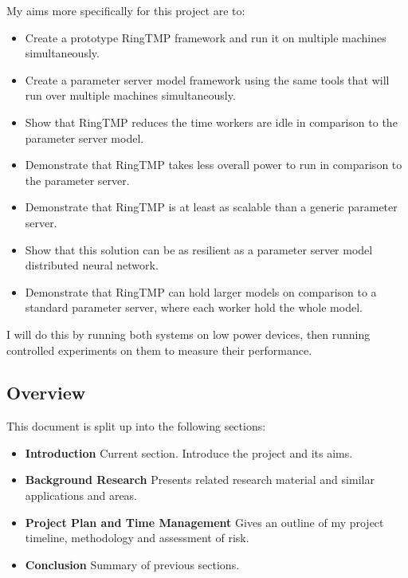 My aims more specifically for this project are to:
\begin{itemize}
    \item Create a prototype RingTMP framework and run it on multiple machines
    simultaneously.
    \item Create a parameter server model framework using the same tools that
    will run over multiple machines simultaneously.
    \item Show that RingTMP reduces the time workers are idle in comparison to
    the parameter server model.
    \item Demonstrate that RingTMP takes less overall power to run in comparison
    to the parameter server.
    \item Demonstrate that RingTMP is at least as scalable than a generic parameter
    server.
    \item Show that this solution can be as resilient as a parameter server
    model distributed neural network.
    \item Demonstrate that RingTMP can hold larger models on comparison to a
    standard parameter server, where each worker hold the whole model.
\end{itemize}
I will do this by running both systems on low power devices, then running
controlled experiments on them to measure their performance.



\subsection{Overview}
This document is split up into the following sections:
\begin{itemize}
 \item \textbf{Introduction} Current section. Introduce the project and its aims.
 \item \textbf{Background Research} Presents related research material and similar applications and areas.
 \item \textbf{Project Plan and Time Management} Gives an outline of my project timeline, methodology and assessment of risk.
 \item \textbf{Conclusion} Summary of previous sections.
\end{itemize}

